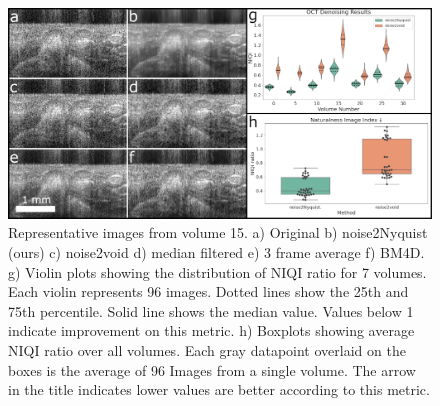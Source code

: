 \documentclass[journal,twoside,web]{ieeecolor}
\begin{document}
\begin{figure}[htb]
	\begin{center}
		\includegraphics[width=\textwidth]{oct/octResultsFigure_ver02}
		\caption{\label{fig:octResults}Representative images from volume 15. a) Original b) noise2Nyquist (ours) c) noise2void d) median filtered e) 3 frame average f) BM4D. g) Violin plots showing the distribution of NIQI ratio for 7 volumes. Each violin represents 96 images. Dotted lines show the 25th and 75th percentile. Solid line shows the median value. Values below 1 indicate improvement on this metric. h) Boxplots showing average NIQI ratio over all volumes. Each gray datapoint overlaid on the boxes is the average of 96 Images from a single volume. The arrow in the title indicates lower values are better according to this metric.}
	\end{center}
\end{figure}
\end{document}
